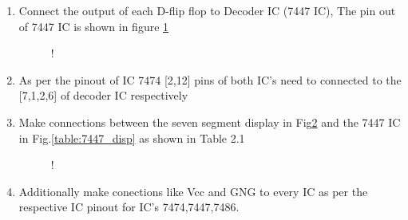 \documentclass[12pt]{article}
\begin{document}
\begin{enumerate}[label=\thesubsection.\arabic*.,ref=\thesubsection.\theenumi]
\begin{figure}[h!]
\begin{center}
\end{center}
\end{figure}
\item Connect the output of each D-flip flop to Decoder IC (7447 IC), The pin out of 7447 IC is shown in figure \ref{fig:7447}
\begin{figure}[!h]
\begin{center}
\resizebox {\columnwidth} {!} {

}
\end{center}
\caption{}
\label{fig:7447}
\end{figure}
\item As per the pinout of IC 7474 [2,12] pins of both IC's need to connected to the [7,1,2,6] of decoder IC respectively
\item Make connections between the seven segment display in Fig\ref{fig:sevenseg} and the 7447 IC in Fig.\ref{table:7447_disp} as shown in Table 2.1
\begin{table}[!h]
\centering

\caption{}
\label{table:7447_disp}
\end{table}
\begin{figure}[!h]
\begin{center}
 {!} {

}
\end{center}
\caption{}
\label{fig:sevenseg}
\end{figure}
\item Additionally make conections like Vcc and GNG to every IC as per the respective IC pinout for IC's 7474,7447,7486.
\end{enumerate}
\end{document}
